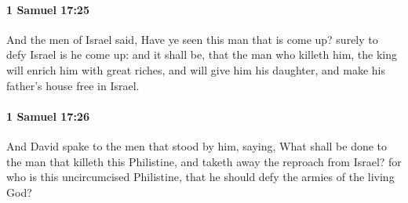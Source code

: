 		\paragraph{1 Samuel 17:25} %
			\label{1SAMUEL-17-25}

			And the men of Israel said, Have ye seen this man that is come up? surely to defy Israel is he come up: and it shall be, that the man who killeth him, the king will enrich him with great riches, and will give him his daughter, and make his father’s house free in Israel.


		\paragraph{1 Samuel 17:26} %
			\label{1SAMUEL-17-26}

			And David spake to the men that stood by him, saying, What shall be done to the man that killeth this Philistine, and taketh away the reproach from Israel? for who is this uncircumcised Philistine, that he should defy the armies of the living God?

